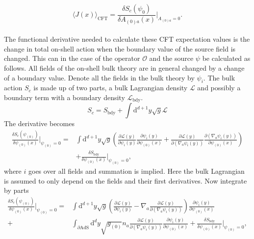 \documentclass[12pt]{report}
\renewcommand{\d}{\ensuremath{\mathrm{d}}}
\renewcommand{\L}{\ensuremath{\mathcal{L}}}
\begin{document}
\begin{equation}
\langle J(x)\rangle_{\mathrm{CFT}}=\frac{\delta S_c(\psi_0)}{\delta A_{(0)a}(x)}|_{A_{(0)a}=0}.
\end{equation}\\
The functional derivative needed to calculate these CFT expectation values is the change in total on-shell action when the boundary value of the source field is changed. This can in the case of the operator $\mathcal{O}$ and the source $\psi$ be calculated as follows. All fields of the on-shell bulk theory are in general changed by a change of a boundary value. Denote all the fields in the bulk theory by $\psi_i$. The bulk action $S_c$ is made up of two parts, a bulk Lagrangian density $\L$ and possibly a boundary term with a boundary density $\L_{\mathrm{bdy}}$.
\begin{equation}
S_c=S_{\mathrm{bdy}}+\int \d^{d+1}y\sqrt{g}\L
\end{equation}
The derivative becomes
\begin{equation}
\begin{split}
\frac{\delta S_c(\psi_{(0)})}{\delta \psi_{(0)}(x)}|_{\psi_{(0)}=0}=&\int \d^{d+1}y\sqrt{g}\left(\frac{\partial\L(y)}{\partial \psi_i(y)}\frac{\partial \psi_i(y)}{\partial \psi_{(0)}(x)}+\frac{\partial\L(y)}{\partial (\nabla_a\psi_i(y))}\frac{\partial (\nabla_a\psi_i(y))}{\partial \psi_{(0)}(x)}\right)\\
&+\frac{\delta S_{\mathrm{bdy}}}{\delta \psi_{(0)}(x)}|_{\psi_{(0)}=0},
\end{split}
\end{equation}
where $i$ goes over all fields and summation is implied. Here the bulk Lagrangian is assumed to only depend on the fields and their first derivatives. Now integrate by parts
\begin{equation}
\begin{split}
\frac{\delta S_c(\psi_{(0)})}{\delta \psi_{(0)}(x)}|_{\psi_{(0)}=0}=&\int \d^{d+1}y\sqrt{g}\left(\frac{\partial\L(y)}{\partial \psi_i(y)}-\nabla_a\frac{\partial\L(y)}{\partial (\nabla_a\psi_i(y))}\right)\frac{\partial \psi_i(y)}{\partial \psi_{(0)}(x)}\\
+&\int_{\partial\mathrm{AdS}} \d^{d}y\sqrt{g_{(0)}}n_a\frac{\partial\L(y)}{\partial (\nabla_a\psi_i(y))}\frac{\partial \psi_i(y)}{\partial \psi_{(0)}(x)}+\frac{\delta S_{\mathrm{bdy}}}{\delta \psi_{(0)}(x)}|_{\psi_{(0)}=0},
\end{split}
\end{equation}
\end{document}

